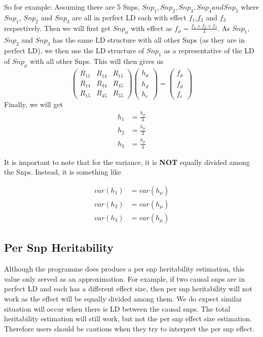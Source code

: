 \documentclass[12pt,a4paper,twoside]{report}
\begin{document}
So for example:
Assuming there are 5 Snps, $Snp_1, Snp_2, Snp_3, Snp_4 and Snp_5$ where $Snp_1$, $Snp_2$ and $Snp_3$ are all in perfect LD each with effect $f_1$,$f_2$ and $f_3$ respectively.
Then we will first get $Snp_\mu$ with effect as $f_\mu = \frac{f_1+f_2+f_3}{3}$. 
As $Snp_1$, $Snp_2$ and $Snp_3$ has the same LD structure with all other Snps (as they are in perfect LD), we then use the LD structure of $Snp_1$ as a representative of the LD of $Snp_\mu$ with all other Snps. 
This will then gives us
\[ \left( \begin{array}{ccc}
R_{11} & R_{14} & R_{15}\\
R_{14} & R_{44} & R_{45}\\
R_{15} & R_{45} & R_{55}
\end{array} \right)
%
\left( \begin{array}{c}
h_\mu \\
h_d \\
h_e
\end{array} \right)
=
\left( \begin{array}{c}
f_\mu \\
f_d \\
f_e
\end{array} \right)
\]
Finally, we will get
\begin{align*}
h_1 &= \frac{h_\mu}{3} \\
h_2 &= \frac{h_\mu}{3} \\
h_3 &= \frac{h_\mu}{3}
\end{align*}

It is important to note that for the variance, it is \textbf{NOT} equally divided among the Snps. 
Instead, it is something like

\begin{align*}
var(h_1) &= var(h_\mu) \\
var(h_2) &= var(h_\mu) \\
var(h_3) &= var(h_\mu)
\end{align*}
\subsection{Per Snp Heritability}
Although the programme does produce a per snp heritability estimation, this value only served as an approximation.
For example, if two causal snps are in perfect LD and each has a different effect size, then per snp heritability will not work as the effect will be equally divided among them.
We do expect similar situation will occur when there is LD between the causal snps.
The total heritability estimation will still work, but not the per snp effect size estimation.
Therefore users should be cautious when they try to interpret the per snp effect.
\end{document}
